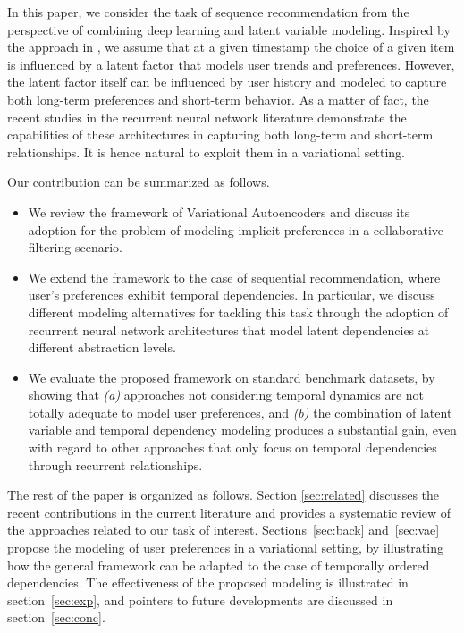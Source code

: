 \documentclass[sigconf]{acmart}
\numberwithin{equation}{section}
\begin{document}
In this paper, we consider the task of sequence recommendation from the
perspective of combining deep learning and latent variable
modeling. Inspired by the approach in
\cite{Liang:2018:VAC:3178876.3186150}, we assume that at a given
timestamp the choice of a given item is influenced by a latent
factor that models user trends and preferences. However, the latent
factor itself can be influenced by user history and modeled to capture
both long-term preferences and short-term behavior. As a matter of
fact, the recent studies in the recurrent neural network literature
\cite{ChungGCB14,Greff:2017,Vaswani:2017} demonstrate the capabilities of these
architectures in capturing both long-term and short-term
relationships. It is hence natural to exploit them in a variational
setting.  

Our contribution can be summarized as follows. 
\begin{itemize}
\item We review the framework of Variational Autoencoders and discuss
  its adoption for the problem of modeling implicit preferences in a
  collaborative filtering scenario. 
\item We extend the framework to the case of sequential
  recommendation, where user's preferences exhibit temporal
  dependencies. In particular, we discuss different modeling
  alternatives for tackling this task through the adoption of
  recurrent neural network architectures that model latent 
  dependencies at different abstraction levels. 
\item We evaluate the proposed framework on standard benchmark
  datasets, by showing that \emph{(a)} approaches not considering
  temporal dynamics are not totally adequate to model user
  preferences, and \emph{(b)} the combination of latent variable
  and temporal dependency modeling produces a substantial
  gain, even with regard to other approaches that only focus on
  temporal dependencies through recurrent relationships. 
\end{itemize}

The rest of the paper is organized as follows. Section
\ref{sec:related} discusses the recent contributions in the current
literature and provides a systematic review of the approaches related
to our task of interest. Sections~\ref{sec:back} and~\ref{sec:vae} propose
the modeling of user preferences in a variational setting, by
illustrating how the general framework can be adapted to the case of
temporally ordered dependencies. The effectiveness of the proposed
modeling is illustrated in section~\ref{sec:exp}, and pointers to
future developments are discussed in section~\ref{sec:conc}.
\end{document}
